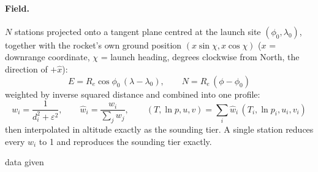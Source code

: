 {\paragraph{Field.} $N$ stations projected onto a tangent plane centred at the launch site
$(\phi_0,\lambda_0)$, together with the rocket's own ground position $(x\sin\chi, x\cos\chi)$
($x$ = downrange coordinate, $\chi$ = launch heading, degrees clockwise from North, the direction
of $+\hat{x}$):
\begin{equation}
    E = R_e\cos\phi_0\,(\lambda-\lambda_0), \qquad N = R_e\,(\phi-\phi_0)
\end{equation}
weighted by inverse squared distance and combined into one profile:
\begin{equation}
    w_i = \frac{1}{d_i^2+\varepsilon^2}, \qquad \hat{w}_i = \frac{w_i}{\sum_j w_j}, \qquad
    (T, \ln p, u, v) = \sum_i \hat{w}_i\,(T_i, \ln p_i, u_i, v_i)
\end{equation}
then interpolated in altitude exactly as the sounding tier. A single station reduces every
$\hat{w}_i$ to 1 and reproduces the sounding tier exactly.}

data given

